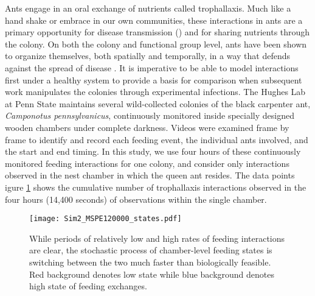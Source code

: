\documentclass[smallextended]{svjour3}       %
\begin{document}
Ants engage in an oral exchange of nutrients called trophallaxis. Much like a hand shake or embrace in our own communities, these interactions in ants are a primary opportunity for disease transmission (\cite{Naug2002}) and for sharing nutrients through the colony. On both the colony and functional group level, ants have been shown to organize themselves, both spatially and temporally, in a way that defends against the spread of disease \cite{Quevillon2015}. It is imperative to be able to model interactions first under a healthy system to provide a basis for comparison when subsequent work manipulates the colonies through experimental infections. The Hughes Lab at Penn State maintains several wild-collected colonies of the black carpenter ant, \textit{Camponotus pennsylvanicus}, continuously monitored inside specially designed wooden chambers under complete darkness. Videos were examined frame by frame to identify and record each feeding event, the individual ants involved, and the start and end timing. In this study, we use four hours of these continuously monitored feeding interactions for one colony, and consider only interactions observed in the nest chamber in which the queen ant resides. The data points igure \ref{f:simplestates} shows the cumulative number of trophallaxis interactions observed in the four hours (14,400 seconds) of observations within the single chamber.

\begin{figure}
 \centerline{\texttt{[image: Sim2\_MSPE120000\_states.pdf]}}
\caption{While periods of relatively low and high rates of feeding interactions are clear, the stochastic process of chamber-level feeding states is switching between the two much faster than biologically feasible. Red background denotes low state while blue background denotes high state of feeding exchanges.}
\label{f:simplestates}
\end{figure}
\end{document}
